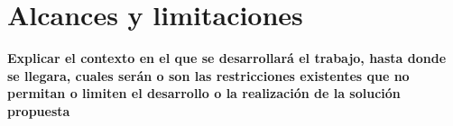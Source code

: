 \section{Alcances y limitaciones}\label{sc:AlcLimi}

\textbf{Explicar el contexto en el que se desarrollará el trabajo, hasta donde se llegara, cuales serán o son las restricciones existentes que no permitan o limiten el desarrollo o la realización de la solución propuesta}